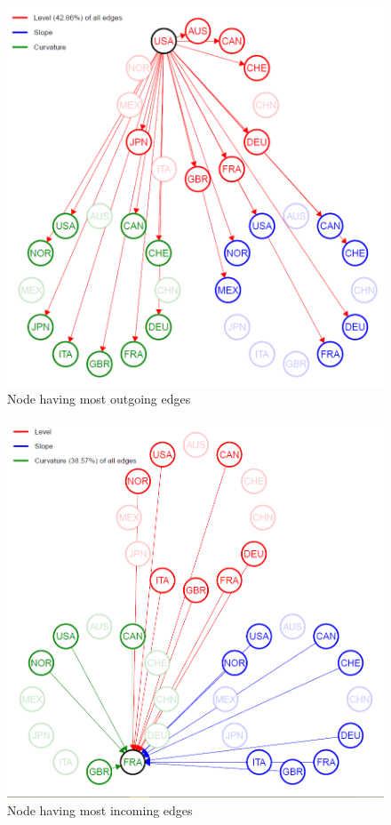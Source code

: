 \documentclass[12pt,bibliography=totoc]{article}
\begin{document}
{\begin{figure}[H]
\includegraphics[width=13.5cm]{top_out}
\centering
\caption{Node having most outgoing edges}

\end{figure}

\begin{figure}[H]

\includegraphics[width=13.5cm]{top_in}
\centering
\caption{Node having most incoming edges}


\end{figure}}
\end{document}
